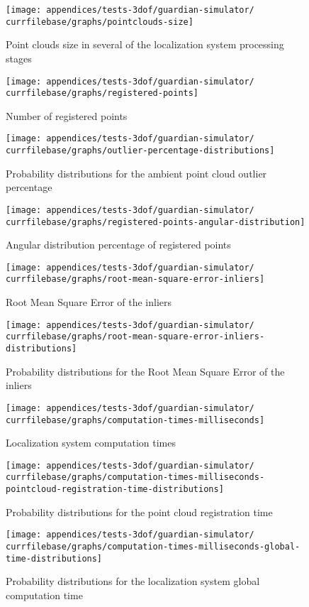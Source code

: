 \begin{figure}[H]
	\centering
	\texttt{[image: appendices/tests-3dof/guardian-simulator/\\currfilebase/graphs/pointclouds-size]}
	\caption{Point clouds size in several of the localization system processing stages}
\end{figure}

\begin{figure}[H]
	\centering
	\texttt{[image: appendices/tests-3dof/guardian-simulator/\\currfilebase/graphs/registered-points]}
	\caption{Number of registered points}
\end{figure}

\begin{figure}[H]
	\centering
	\texttt{[image: appendices/tests-3dof/guardian-simulator/\\currfilebase/graphs/outlier-percentage-distributions]}
	\caption{Probability distributions for the ambient point cloud outlier percentage}
\end{figure}


\begin{figure}[H]
	\centering
	\texttt{[image: appendices/tests-3dof/guardian-simulator/\\currfilebase/graphs/registered-points-angular-distribution]}
	\caption{Angular distribution percentage of registered points}
\end{figure}

\begin{figure}[H]
	\centering
	\texttt{[image: appendices/tests-3dof/guardian-simulator/\\currfilebase/graphs/root-mean-square-error-inliers]}
	\caption{Root Mean Square Error of the inliers}
\end{figure}

\begin{figure}[H]
	\centering
	\texttt{[image: appendices/tests-3dof/guardian-simulator/\\currfilebase/graphs/root-mean-square-error-inliers-distributions]}
	\caption{Probability distributions for the Root Mean Square Error of the inliers}
\end{figure}


\begin{figure}[H]
	\centering
	\texttt{[image: appendices/tests-3dof/guardian-simulator/\\currfilebase/graphs/computation-times-milliseconds]}
	\caption{Localization system computation times}
\end{figure}

\begin{figure}[H]
	\centering
	\texttt{[image: appendices/tests-3dof/guardian-simulator/\\currfilebase/graphs/computation-times-milliseconds-pointcloud-registration-time-distributions]}
	\caption{Probability distributions for the point cloud registration time}
\end{figure}

\begin{figure}[H]
	\centering
	\texttt{[image: appendices/tests-3dof/guardian-simulator/\\currfilebase/graphs/computation-times-milliseconds-global-time-distributions]}
	\caption{Probability distributions for the localization system global computation time}
\end{figure}
